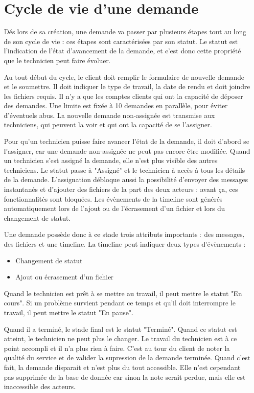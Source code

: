 \documentclass[
    iai, %
    eai, %
]{heig-tb}
\begin{document}
\section{Cycle de vie d'une demande}
Dés lors de sa création, une demande va passer par plusieurs étapes tout au long de son cycle de vie : ces étapes sont caractérisées par son statut.
Le statut est l'indication de l'état d'avancement de la demande, et c'est donc cette propriété que le technicien peut faire évoluer.

Au tout début du cycle, le client doit remplir le formulaire de nouvelle demande et le soumettre. Il doit indiquer le type de travail, la date de rendu et doit joindre les fichiers requis.
Il n'y a que les comptes clients qui ont la capacité de déposer des demandes. Une limite est fixée à 10 demandes en parallèle, pour éviter d'éventuels abus.
La nouvelle demande non-assignée est transmise aux techniciens, qui peuvent la voir et qui ont la capacité de se l'assigner.

Pour qu'un technicien puisse faire avancer l'état de la demande, il doit d'abord se l'assigner, car une demande non-assignée ne peut pas encore être modifiée.
Quand un technicien s'est assigné la demande, elle n'est plus visible des autres techniciens. Le statut passe à "Assigné" et le technicien à accès à tous les détails de la demande.
L'assignation débloque aussi la possibilité d'envoyer des messages instantanés et d'ajouter des fichiers de la part des deux acteurs : avant ça, ces fonctionnalités sont bloquées.
Les évènements de la timeline sont générés automatiquement lors de l'ajout ou de l'écrasement d'un fichier et lors du changement de statut.

Une demande possède donc à ce stade trois attributs importants : des messages, des fichiers et une timeline.
La timeline peut indiquer deux types d'évènements :
\begin{itemize}
  \item Changement de statut
  \item Ajout ou écrasement d'un fichier
\end{itemize}

\newpage
Quand le technicien est prêt à se mettre au travail, il peut mettre le statut "En cours". Si un problème survient pendant ce temps et qu'il doit interrompre le travail, il peut mettre le statut "En pause".

Quand il a terminé, le stade final est le statut "Terminé". Quand ce statut est atteint, le technicien ne peut plus le changer. Le travail du technicien est à ce point accompli et il n'a plus rien à faire. C'est au tour du client de noter la qualité du service et de valider la supression de la demande terminée. Quand c'est fait, la demande disparait et n'est plus du tout accessible. Elle n'est cependant pas supprimée de la base de donnée car sinon la note serait perdue, mais elle est inaccessible des acteurs.
\end{document}
